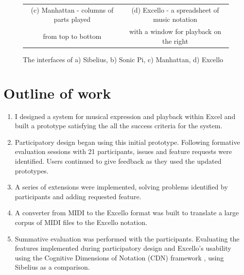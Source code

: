 \begin{figure}[ht]
\begin{tabular}{cc}
  (c) Manhattan - columns of parts played&(d) Excello - a spreadsheet of music notation\\
  from top to bottom&with a window for playback on the right\\
\end{tabular}
\caption{The interfaces of a) Sibelius, b) Sonic Pi, c) Manhattan, d) Excello}
\label{intro:interfaces}
\end{figure}

\vspace{-10pt}

\section{Outline of work}

\begin{enumerate}

\item I designed a system for musical expression and playback within Excel and built a prototype satisfying the all the success criteria for the system.

\item Participatory design began using this initial prototype. Following formative evaluation sessions with 21 participants, issues and feature requests were identified. Users continued to give feedback as they used the updated prototypes.

\item A series of extensions were implemented, solving problems identified by participants and adding requested feature.

\item A converter from MIDI to the Excello format was built to translate a large corpus of MIDI files to the Excello notation.

\item Summative evaluation was performed with the participants. Evaluating the features implemented during participatory design and Excello's usability using the Cognitive Dimensions of Notation (CDN) framework \cite{blackwell:tutorial}, using Sibelius as a comparison.

\end{enumerate}
